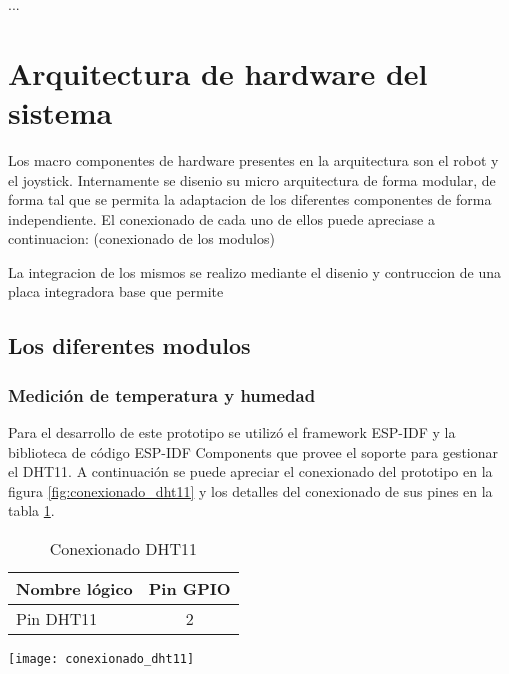 ...


\section{Arquitectura de hardware del sistema}

Los macro componentes de hardware presentes en la arquitectura son el robot y el joystick.
Internamente se disenio su micro arquitectura de forma modular, de forma tal que se permita la adaptacion de los diferentes componentes de forma independiente.
El conexionado de cada uno de ellos puede apreciase a continuacion:
(conexionado de los modulos)

La integracion de los mismos se realizo mediante el disenio y contruccion de una placa integradora base que permite


\subsection{Los diferentes modulos}


\subsubsection{Medición de temperatura y humedad}

Para el desarrollo de este prototipo se utilizó el framework ESP-IDF y la biblioteca de código ESP-IDF Components que provee el soporte para gestionar el DHT11. A continuación se puede apreciar el conexionado del prototipo en la figura \ref{fig:conexionado_dht11} y los detalles del conexionado de sus pines en la tabla \ref{tab:conexionado_dht11}.


\vspace{0.5cm}
\begin{table}[h]
\centering
\caption[Conexionado DHT11]{Conexionado DHT11}
\begin{tabular}{l c }
\toprule
\textbf{Nombre lógico} &  \textbf{Pin GPIO}\\
\midrule
 Pin DHT11  & 2  \\
\bottomrule
\hline
\end{tabular}
\label{tab:conexionado_dht11} 
\end{table}
 
\vspace{0.5cm}   
\begin{center}
  \texttt{[image: conexionado\_dht11]}
    \label{fig:conexionado_dht11}
\end{center}



